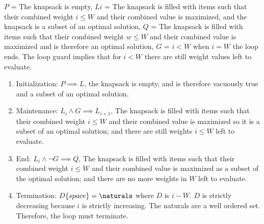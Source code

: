 \documentclass{article}
\begin{document}
\begin{enumerate}
$P$ = The knapsack is empty, $Li$ = The knapsack is filled with items such that their combined weight $i \leq W$ and their combined value is maximized, and the knapsack is a subset of an optimal solution, $Q$ = The knapsack is filled with items such that their combined weight $w \leq W$ and their combined value is maximized and is therefore an optimal solution, $G$ = $i < W$ when $i = W$ the loop ends. The loop guard implies that for $i < W$ there are still weight values left to evaluate.
    \begin{enumerate}
        \item Initialization: $P \implies L$, the knapsack is empty, and is therefore vacuously true and a subset of an optimal solution.
        \item Maintenance: $L_{i} \land G \implies L_{i+1}$, The knapsack is filled with items such that their combined weight $i \leq W$ and their combined value is maximized so it is a subset of an optimal solution; and there are still weights $i \leq W$ left to evaluate.
        \item End: $L_{i} \land \neg G \implies Q$, The knapsack is filled with items such that their combined weight $i \leq W$ and their combined value is maximized as a subset of the optimal solution; and there are no more weights in $W$ left to evaluate. 
        \item Termination: $D\{space\} = \naturals$ where $D$ is $i - W$. $D$ is strictly decreasing because $i$ is strictly increasing. The naturals are a well ordered set. Therefore, the loop must terminate. 
    \end{enumerate}
        
\end{enumerate}
\end{document}
